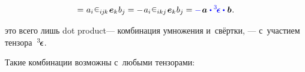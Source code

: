 \begin{otherlanguage}{russian}
\begin{multline}
\\[-0.12em]
= \hspace{.1ex} a_i \hspace{.1ex} \levicivita_{i\hspace{-0.1ex}j\hspace{-0.1ex}k} \hspace{.2ex} \bm{e}_k \hspace{.1ex} b_j
= - \hspace{.2ex} a_i \hspace{.1ex} \levicivita_{ikj} \hspace{.2ex} \bm{e}_k \hspace{.1ex} b_j
= \mathcolor{blue}{-} \hspace{.2ex} \bm{a} \hspace{.1ex} \mathcolor{blue}{\dotp \levicivitatensor \dotp} \hspace{.12ex} \bm{b}
\hspace{.1ex} .
\end{multline}

\vspace{-0.12em} \noindent {} это всего лишь dot product\:--- комбинация умножения и~свёртки, \:--- с~участием тензора~${^3\hspace{-0.25ex}\bm{\epsilon}}\hspace{.05ex}$.

Такие комбинации возможны с~любыми тензорами:


\end{otherlanguage}

